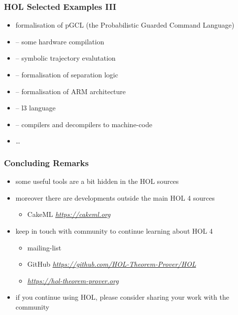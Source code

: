 \begin{frame}
\frametitle{HOL Selected Examples III}
\begin{itemize}
\item {} formalisation of pGCL (the Probabilistic Guarded Command Language)
\item {} -- some hardware compilation
\item {} -- symbolic trajectory evalutation
\item {} -- formalisation of separation logic
\item {} -- formalisation of ARM architecture
\item {} -- l3 language
\item {} -- compilers and decompilers to machine-code
\item \ldots
\end{itemize}
\end{frame}


\begin{frame}
\frametitle{Concluding Remarks}
\begin{itemize}
\item some useful tools are a bit hidden in the HOL sources
\item moreover there are developments outside the main HOL 4 sources
\begin{itemize}
\item CakeML \emph{\url{https://cakeml.org}}
\end{itemize}
\item keep in touch with community to continue learning about HOL 4
\begin{itemize}
\item mailing-list 
\item GitHub \emph{\url{https://github.com/HOL-Theorem-Prover/HOL}}
\item \emph{\url{https://hol-theorem-prover.org}}
\end{itemize}
\item if you continue using HOL, please consider sharing your work with the community
\end{itemize}
\end{frame}

